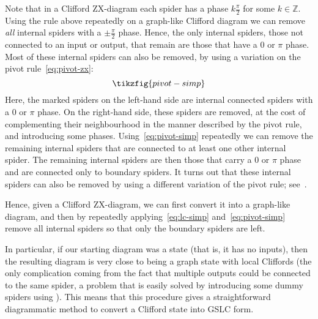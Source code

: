 \documentclass[a4paper,onecolumn,superscriptaddress,11pt,%
				unpublished,%
				allowfontchageintitle,%
				]{quantumarticle}
\begin{document}
Note that in a Clifford ZX-diagram each spider has a phase $k\frac\pi2$ for some $k\in\mathbb{Z}$. Using the rule above repeatedly on a graph-like Clifford diagram we can remove \emph{all} internal spiders with a $\pm \frac\pi2$ phase. Hence, the only internal spiders, those not connected to an input or output, that remain are those that have a $0$ or $\pi$ phase.
Most of these internal spiders can also be removed, by using a variation on the pivot rule~\eqref{eq:pivot-zx}:
\begin{equation}\label{eq:pivot-simp}
\tikzfig{pivot-simp}
\end{equation}
Here, the marked spiders on the left-hand side are internal connected spiders with a $0$ or $\pi$ phase. On the right-hand side, these spiders are removed, at the cost of complementing their neighbourhood in the manner described by the pivot rule, and introducing some phases.
Using~\eqref{eq:pivot-simp} repeatedly we can remove the remaining internal spiders that are connected to at least one other internal spider. The remaining internal spiders are then those that carry a $0$ or $\pi$ phase and are connected only to boundary spiders. It turns out that these internal spiders can also be removed by using a different variation of the pivot rule; see~\cite{cliffsimp}.

Hence, given a Clifford ZX-diagram, we can first convert it into a graph-like diagram, and then by repeatedly applying~\eqref{eq:lc-simp} and~\eqref{eq:pivot-simp} remove all internal spiders so that only the boundary spiders are left.

In particular, if our starting diagram was a state (that is, it has no inputs), then the resulting diagram is very close to being a graph state with local Cliffords (the only complication coming from the fact that multiple outputs could be connected to the same spider, a problem that is easily solved by introducing some dummy spiders using \IdRule).
This means that this procedure gives a straightforward diagrammatic method to convert a Clifford state into GSLC form.
\end{document}
